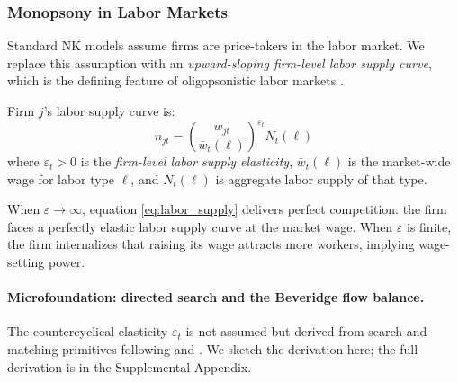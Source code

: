 \subsubsection{Monopsony in Labor Markets}

Standard NK models assume firms are price-takers in the labor market. We
replace this assumption with an \emph{upward-sloping firm-level labor supply
curve}, which is the defining feature of oligopsonistic labor markets
\citep{manning2011, card2018}.

Firm $j$'s labor supply curve is:
\begin{equation}
  n_{jt} = \left(\frac{w_{jt}}{\bar{w}_t(\ell)}\right)^{\varepsilon_t}
  \bar{N}_t(\ell)
  \label{eq:labor_supply}
\end{equation}
where $\varepsilon_t > 0$ is the \emph{firm-level labor supply elasticity},
$\bar{w}_t(\ell)$ is the market-wide wage for labor type $\ell$, and
$\bar{N}_t(\ell)$ is aggregate labor supply of that type.

When $\varepsilon \to \infty$, equation \eqref{eq:labor_supply} delivers
perfect competition: the firm faces a perfectly elastic labor supply curve at
the market wage. When $\varepsilon$ is finite, the firm internalizes that
raising its wage attracts more workers, implying wage-setting power.

\paragraph{Microfoundation: directed search and the Beveridge flow balance.}
\label{sec:micro_search}
The countercyclical elasticity $\varepsilon_t$ is not assumed but derived
from search-and-matching primitives following \citet{manning2003} and
\citet{berger2022monopsony}. We sketch the derivation here; the full
derivation is in the Supplemental Appendix.

